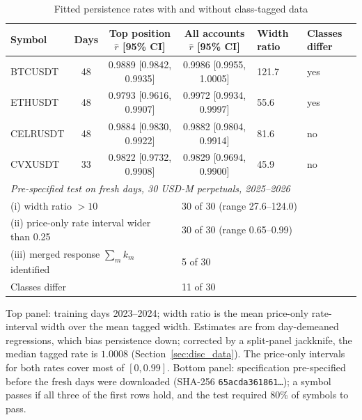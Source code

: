 \documentclass[12pt]{article}
\theoremstyle{definition}
\theoremstyle{remark}
\begin{document}
\begin{table}[t]\centering\small
\begin{threeparttable}
\caption{Fitted persistence rates with and without class-tagged data}\label{tab:disc}
\setlength{\tabcolsep}{3pt}
\begin{tabular}{lcccp{}p{}}
\toprule
Symbol & Days & Top position $\hat r$ [95\% CI] & All accounts $\hat r$ [95\% CI] & Width ratio & Classes differ\\
\midrule
BTCUSDT & 48 & 0.9889 [0.9842, 0.9935] & 0.9986 [0.9955, 1.0005] & 121.7 & yes\\
ETHUSDT & 48 & 0.9793 [0.9616, 0.9907] & 0.9972 [0.9934, 0.9997] & 55.6 & yes\\
CELRUSDT & 48 & 0.9884 [0.9830, 0.9922] & 0.9882 [0.9804, 0.9914] & 81.6 & no\\
CVXUSDT & 33 & 0.9822 [0.9732, 0.9908] & 0.9829 [0.9694, 0.9900] & 45.9 & no\\
\midrule
\multicolumn{6}{l}{\emph{Pre-specified test on fresh days, 30 USD-M perpetuals, 2025--2026}}\\
\multicolumn{3}{l}{(i) width ratio $>10$} & \multicolumn{3}{l}{30 of 30 (range 27.6--124.0)}\\
\multicolumn{3}{l}{(ii) price-only rate interval wider than 0.25} & \multicolumn{3}{l}{30 of 30 (range 0.65--0.99)}\\
\multicolumn{3}{l}{(iii) merged response $\sum_mk_m$ identified} & \multicolumn{3}{l}{5 of 30}\\
\multicolumn{3}{l}{Classes differ} & \multicolumn{3}{l}{11 of 30}\\
\bottomrule
\end{tabular}
\begin{tablenotes}\footnotesize\item Top panel: training days 2023--2024; width ratio is the mean price-only rate-interval width over the mean tagged width. Estimates are from day-demeaned regressions, which bias persistence down; corrected by a split-panel jackknife, the median tagged rate is $1.0008$ (Section~\ref{sec:disc_data}). The price-only intervals for both rates cover most of $[0,0.99]$. Bottom panel: specification pre-specified before the fresh days were downloaded (SHA-256 \texttt{65acda361861\ldots}); a symbol passes if all three of the first rows hold, and the test required 80\% of symbols to pass. \end{tablenotes}
\end{threeparttable}
\end{table}
\end{document}

